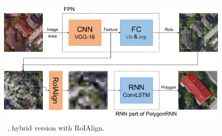 \begin{figure}[!h]
	\centering
	\includegraphics[width=\fig\textwidth]{3-17.pdf}
    \caption[\modelnameshort\ , hybrid version with RoIAlign]{\modelnameshort\ , hybrid version with RoIAlign.}
    \label{fig:algmod}
\end{figure}